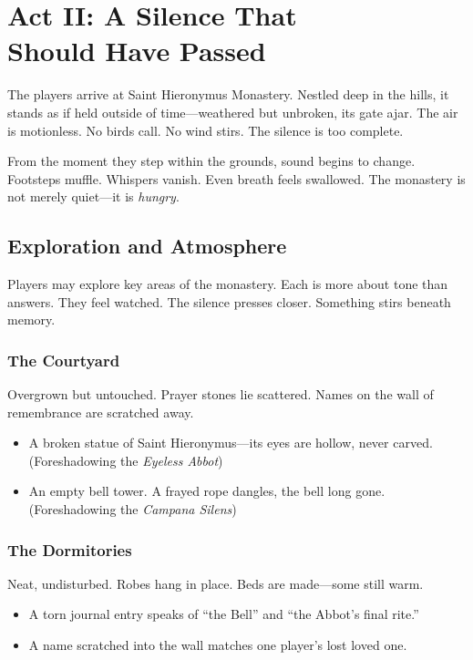\newcolumn
\section[Act II: A Silence That Should Have Passed]{Act II: A Silence That\\ Should Have Passed}

The players arrive at Saint Hieronymus Monastery. Nestled deep in the hills, it stands as if held outside of time—weathered but unbroken, its gate ajar. The air is motionless. No birds call. No wind stirs. The silence is too complete.

From the moment they step within the grounds, sound begins to change. Footsteps muffle. Whispers vanish. Even breath feels swallowed. The monastery is not merely quiet—it is \emph{hungry}.

\subsection{Exploration and Atmosphere}

Players may explore key areas of the monastery. Each is more about tone than answers. They feel watched. The silence presses closer. Something stirs beneath memory.

\subsubsection{The Courtyard}
Overgrown but untouched. Prayer stones lie scattered. Names on the wall of remembrance are scratched away.

\begin{Example}{}
    \begin{itemize}
        \item A broken statue of Saint Hieronymus—its eyes are hollow, never carved. (Foreshadowing the \emph{Eyeless Abbot})
        \item An empty bell tower. A frayed rope dangles, the bell long gone. (Foreshadowing the \emph{Campana Silens})
    \end{itemize}
\end{Example}

\subsubsection{The Dormitories}
Neat, undisturbed. Robes hang in place. Beds are made—some still warm.

\begin{Example}{}
    \begin{itemize}
        \item A torn journal entry speaks of “the Bell” and “the Abbot’s final rite.”
        \item A name scratched into the wall matches one player’s lost loved one.
    \end{itemize}
\end{Example}

